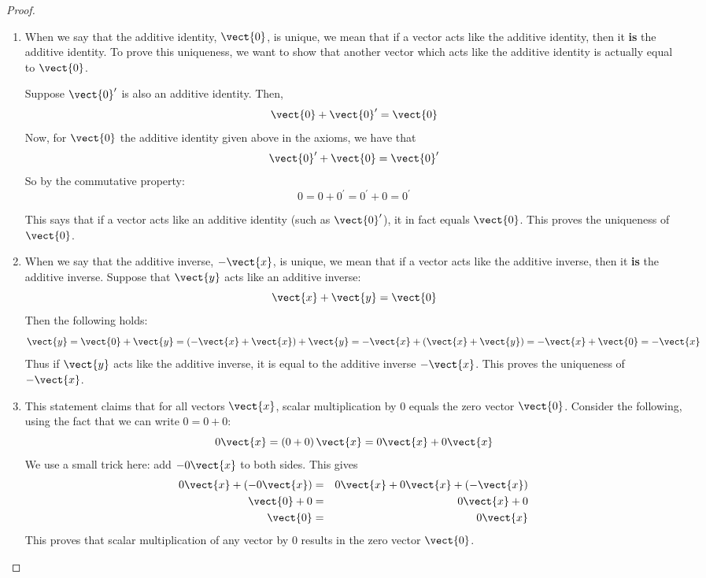 \begin{proof}
\begin{enumerate}
\item
When we say that the additive identity, $\vect{0}$, is unique, we mean that if a vector acts like the additive identity, then it \textbf{is} the additive identity. To prove this uniqueness, we want to show that another vector which acts like the additive identity is actually equal to $\vect{0}$. 

Suppose $\vect{0}^{\prime }$ is also an additive identity. Then,
\[
\vect{0} + \vect{0}^{\prime} = \vect{0}
\]
Now, for $\vect{0}$ the additive identity given above in the axioms, we have that 
\[
\vect{0}^{\prime} + \vect{0} = \vect{0}^{\prime}
\]
So by the commutative property:
\[
0 = 0 + 0^{\prime} = 0^{\prime} + 0 = 0^{\prime}
\]

This says that if a vector acts like an additive identity (such as $\vect{0}^{\prime}$), it in fact equals $\vect{0}$. This proves the uniqueness of $\vect{0}$.

\item
When we say that the additive inverse, $-\vect{x}$, is unique, we mean that if a vector acts like the additive inverse, then it \textbf{is} the additive inverse. 
Suppose that $\vect{y}$ acts like an additive inverse: 
\begin{equation*}
\vect{x}+\vect{y}=\vect{0}
\end{equation*}
Then the following holds:
\[
\vect{y} = \vect{0} + \vect{y} = (-\vect{x} + \vect{x}) + \vect{y} = -\vect{x} + (\vect{x} + \vect{y}) = -\vect{x} + \vect{0} = -\vect{x}
\]
Thus if $\vect{y}$ acts like the additive inverse, it is equal to the additive
inverse $-\vect{x}$. This proves the uniqueness of $-\vect{x}$. 

\item
This statement claims that for all vectors $\vect{x}$, scalar multiplication by $0$ equals the zero vector $\vect{0}$. Consider the following, using the fact that we can write $0=0+0$:
\begin{equation*}
0\vect{x}=\left( 0+0\right) \vect{x}=0\vect{x}+0\vect{x}
\end{equation*}
We use a small trick here: add $-0\vect{x}$ to both sides. This gives 
\begin{eqnarray*}
0\vect{x} + (-0\vect{x})&=&0\vect{x}+0\vect{x}+(-\vect{x})\\
\vect{0} + 0 &=&0\vect{x} + 0 \\
\vect{0} &=& 0\vect{x}
\end{eqnarray*}
This proves that scalar multiplication of any vector by $0$ results in the zero vector $\vect{0}$. 


\end{enumerate}
\end{proof}
